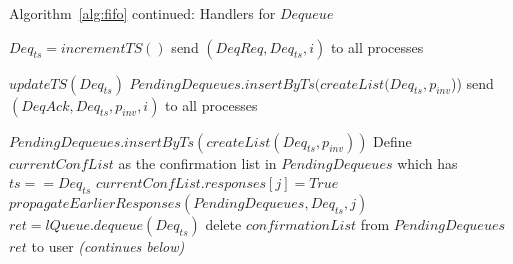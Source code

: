 \documentclass[a4paper,anonymous,USenglish]{lipics-v2021} %
\theoremstyle{definition}
\newcommand{\red}[1]{\textcolor{red}{#1}} %
\begin{document}
\begin{algorithm}
  \caption{Algorithm~\ref{alg:fifo} continued: Handlers for $Dequeue$}
  \begin{algorithmic}[1]
      \State $Deq_{ts} = incrementTS()$ \label{fifoline:deqTS}
      \State send $(DeqReq, Deq_{ts}, i)$ to all processes \label{fifoline:sendDeqReq}
    \EndFunction

    \State $updateTS(Deq_{ts})$ \label{fifoline:deqReqTSUpdate}
      \State $PendingDequeues.insertByTs(createList(Deq_{ts}, p_{inv}$))\label{fifoline:savePendingDeq}
      \EndIf
      \State send $(DeqAck, Deq_{ts}, p_{inv}, i)$ to all processes \label{fifoline:sendSafetyFlag}\label{fifoline:sendDeqAck}
    \EndFunction

        \State $PendingDequeues.insertByTs(createList(Deq_{ts}, p_{inv}))$
      \EndIf
      \State Define $currentConfList$ as the confirmation list in $PendingDequeues$ which has $ts == Deq_{ts}$\Comment{\red{Cole/Sam: I realized this needs to happen before propagate $EarlierResponses()$. Verify this makes sense and works.}}
      \State $currentConfList.responses[j] = True$ \label{fifoline:setResponse}
      \State $propagateEarlierResponses(PendingDequeues, Deq_{ts}, j)$ \label{fifoline:propagateEarlier} 
        \label{fifoline:fullConfList}
          \State $ret = lQueue.dequeue(Deq_{ts})$\label{fifoline:chooseDeqValue}  
        \State delete $confirmationList$ from $PendingDequeues$
         \Return $ret$ to user \label{fifoline:deqReturn} \EndIf {}
      \EndIf 
      \EndFor
      \EndFunction
      \Statex
      \Statex \emph{(continues below)}


\end{algorithmic}
\end{algorithm}
\end{document}
